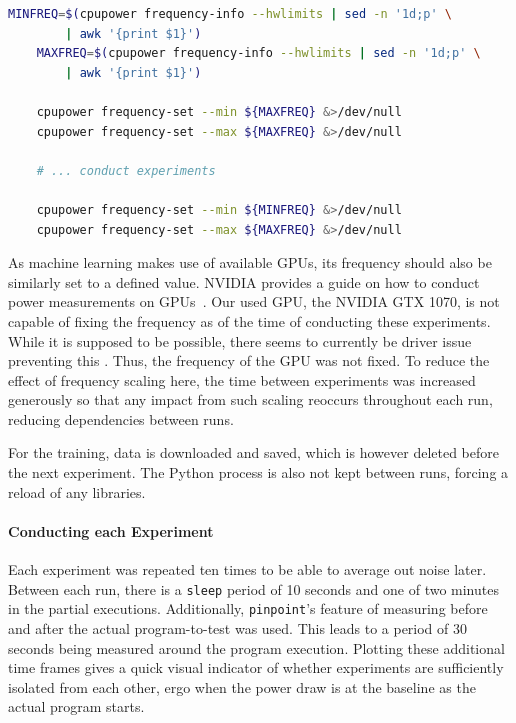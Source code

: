 \begin{minipage}{\linewidth}
\begin{lstlisting}[language=bash, frame=single, numbers=none, caption={Used operating system information}, basicstyle=\ttfamily]
    MINFREQ=$(cpupower frequency-info --hwlimits | sed -n '1d;p' \
        | awk '{print $1}')
    MAXFREQ=$(cpupower frequency-info --hwlimits | sed -n '1d;p' \
        | awk '{print $1}')
    
    cpupower frequency-set --min ${MAXFREQ} &>/dev/null
    cpupower frequency-set --max ${MAXFREQ} &>/dev/null

    # ... conduct experiments

    cpupower frequency-set --min ${MINFREQ} &>/dev/null
    cpupower frequency-set --max ${MAXFREQ} &>/dev/null
\end{lstlisting}
\label{listing:setting_cpu_frequency}
\end{minipage}

As machine learning makes use of available GPUs, its frequency should also be similarly set to a defined value. 
NVIDIA provides a guide on how to conduct power measurements on GPUs~.
Our used GPU, the NVIDIA GTX 1070, is not capable of fixing the frequency as of the time of conducting these experiments. 
While it is supposed to be possible, there seems to currently be driver issue preventing this .
Thus, the frequency of the GPU was not fixed. 
To reduce the effect of frequency scaling here, the time between experiments was increased generously so that any impact from such scaling reoccurs throughout each run, reducing dependencies between runs.

For the training, data is downloaded and saved, which is however deleted before the next experiment. 
The Python process is also not kept between runs, forcing a reload of any libraries.

\paragraph{Conducting each Experiment}

Each experiment was repeated ten times to be able to average out noise later.
Between each run, there is a \verb|sleep| period of 10 seconds and one of two minutes in the partial executions. 
Additionally, \verb|pinpoint|'s feature of measuring before and after the actual program-to-test was used. 
This leads to a period of 30 seconds being measured around the program execution. 
Plotting these additional time frames gives a quick visual indicator of whether experiments are sufficiently isolated from each other, ergo when the power draw is at the baseline as the actual program starts.

